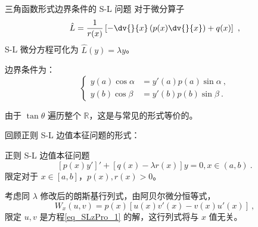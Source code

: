 

\begin{issues}
\issueDraft
\issueTODO
\end{issues}


\begin{definition}{三角函数形式边界条件的 S-L 问题}\label{def_SLzPro_1}
对于微分算子
\begin{equation}
\hat L = \frac{1}{r(x)} \left[-\dv{}{x}\left(p(x)\dv{}{x}\right) + q(x)\right] ~,
\end{equation}
S-L 微分方程可化为 $\hat L (y) = \lambda y$。

边界条件为：
\begin{equation}
\left\{\begin{aligned}
y(a) \cos \alpha &= y'(a) p(a) \sin \alpha ~, \\
y(b) \cos \beta &= y'(b) p(b) \sin \beta ~.
\end{aligned}\right.
\end{equation}

由于 $\tan \theta$ 遍历整个 $\mathbb R$，这是与常见的形式等价的。

\end{definition}

回顾正则 S-L 边值本征问题的形式：
\begin{definition}{正则 S-L 边值本征问题}
\begin{equation}\label{eq_SLzPro_1}
[p(x) y']' + [q(x) - \lambda r(x)] y = 0, x \in (a, b) ~.
\end{equation}
限定对于 $x \in [a, b]$，$p(x) , r(x) > 0$。
\end{definition}
考虑同 $\lambda$ 修改后的朗斯基行列式，由阿贝尔微分恒等式，
\begin{equation}
W_x(u, v) = p(x) [u(x) v'(x) - v(x) u'(x)] ~,
\end{equation}
限定 $u, v$ 是方程\autoref{eq_SLzPro_1} 的解，这行列式将与 $x$ 值无关。

